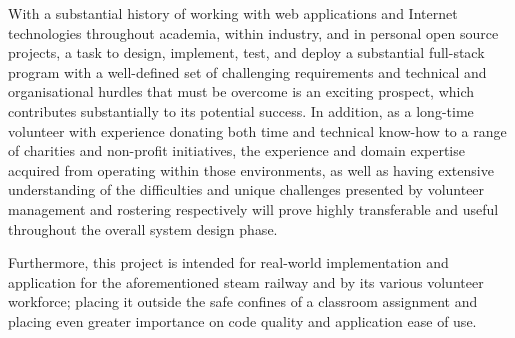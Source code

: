 With a substantial history of working with web applications and Internet technologies throughout academia, within industry, and in personal open source projects, a task to design, implement, test, and deploy a substantial full-stack program with a well-defined set of challenging requirements and technical and organisational hurdles that must be overcome is an exciting prospect, which contributes substantially to its potential success. In addition, as a long-time volunteer with experience donating both time and technical know-how to a range of charities and non-profit initiatives, the experience and domain expertise acquired from operating within those environments, as well as  having extensive understanding of the difficulties and unique challenges presented by volunteer management and rostering respectively will prove highly transferable and useful throughout the overall system design phase.

Furthermore, this project is intended for real-world implementation and application for the aforementioned steam railway and by its various volunteer workforce; placing it outside the safe confines of a classroom assignment and placing even greater importance on code quality and application ease of use.
